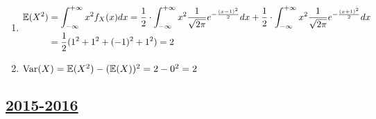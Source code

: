 \begin{enumerate}
\begin{enumerate}
\item  \begin{align*}
\operatorname{\mathbb{E}}(X^2) &= \int_{-\infty}^{+\infty} x^2 f_X (x) dx  =
\frac{1}{2} \cdot \int_{-\infty}^{+\infty} x^2 \frac{1}{\sqrt{2\pi}} e^{-\frac{(x-1)^2}{2}} dx  +
\frac{1}{2}  \cdot \int_{-\infty}^{+\infty} x^2 \frac{1}{\sqrt{2\pi}} e^{-\frac{(x+1)^2}{2}} dx \\
&= \frac{1}{2}(1^2 + 1^2 + (-1)^2 + 1^2) =  2
\end{align*}
\item $\operatorname{Var}(X) = \operatorname{\mathbb{E}}(X^2) - (\operatorname{\mathbb{E}}(X))^2 = 2 - 0^2 = 2$
\end{enumerate}
\end{enumerate}



\subsection[2015-2016]{\hyperref[sec:kr_02_2015_2016]{2015-2016}}
\label{sec:sol_kr_02_2015_2016}


